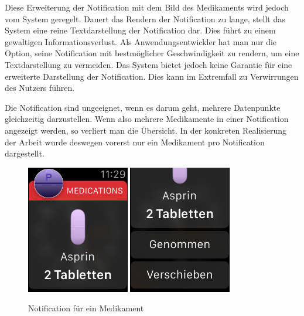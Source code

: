  Diese Erweiterung der Notification mit dem Bild des Medikaments wird jedoch vom System geregelt. Dauert das Rendern der Notification zu lange, stellt das System eine reine Textdarstellung der Notification dar. Dies führt zu einem gewaltigen Informationsverlust. Als Anwendungsentwickler hat man nur die Option, seine Notification mit bestmöglicher Geschwindigkeit zu rendern, um eine Textdarstellung zu vermeiden. Das System bietet jedoch keine Garantie für eine erweiterte Darstellung der Notification. Dies kann im Extremfall zu Verwirrungen des Nutzers führen.
 
Die Notification sind ungeeignet, wenn es darum geht, mehrere Datenpunkte gleichzeitig darzustellen. Wenn also mehrere Medikamente in einer Notification angezeigt werden, so verliert man die Übersicht. In der konkreten Realisierung der Arbeit wurde deswegen vorerst nur ein Medikament pro Notification dargestellt.
\begin{figure}
	\caption{Notification für ein Medikament}
	\label{fig:watch-app-notification}
	\centering
	\includegraphics[width=0.4\textwidth]{04_realisation/screenshots/watch/notification01.png}
	\includegraphics[width=0.4\textwidth]{04_realisation/screenshots/watch/notification02.png}
\end{figure}

